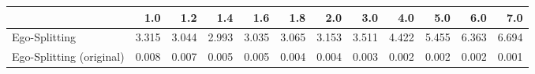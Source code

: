 \begin{tabular}{lrrrrrrrrrrr}
\toprule
{} &   1.0 &   1.2 &   1.4 &   1.6 &   1.8 &   2.0 &   3.0 &   4.0 &   5.0 &   6.0 &   7.0 \\
\midrule
Ego-Splitting            & 3.315 & 3.044 & 2.993 & 3.035 & 3.065 & 3.153 & 3.511 & 4.422 & 5.455 & 6.363 & 6.694 \\
Ego-Splitting (original) & 0.008 & 0.007 & 0.005 & 0.005 & 0.004 & 0.004 & 0.003 & 0.002 & 0.002 & 0.002 & 0.001 \\
\bottomrule
\end{tabular}
